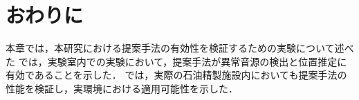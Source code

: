 \documentclass[../main]{subfiles}
\begin{document}
\section{おわりに}
\label{sec:vexp_conclusion}
本章では，本研究における提案手法の有効性を検証するための実験について述べた
では，実験室内での実験において，提案手法が異常音源の検出と位置推定に有効であることを示した．
では，実際の石油精製施設内においても提案手法の性能を検証し，実環境における適用可能性を示した．
\end{document}
